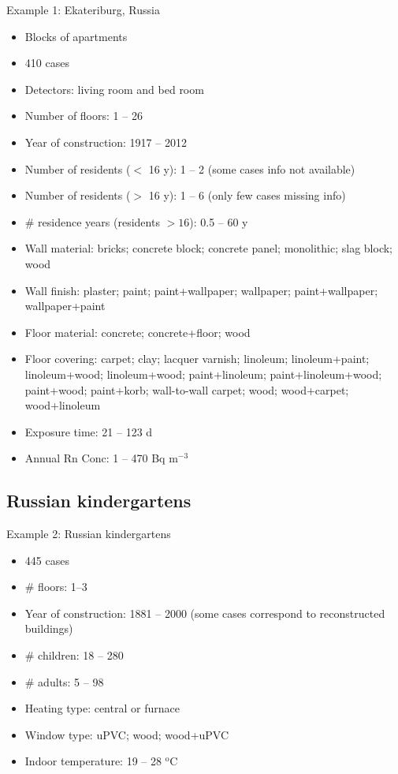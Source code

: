 \documentclass[xcolor=svgnames]{beamer}
\newcommand{\1}{\'{\i}}
\begin{document}
\begin{frame}[allowframebreaks]{Example 1: Ekateriburg, Russia}

\begin{itemize}
\item Blocks of apartments
\item 410 cases
\item Detectors: living room and bed room
\item Number of floors: 1 -- 26
\item Year of construction: 1917 -- 2012
\item Number of residents ($<$ 16 y): 1 -- 2 (some cases info not available)
\item Number of residents ($>$ 16 y): 1 -- 6 (only few cases missing info)
\item \# residence years (residents $>16$): 0.5 -- 60 y
\item Wall material: bricks; concrete block; concrete panel; monolithic; slag block; wood
\item Wall finish: plaster; paint; paint+wallpaper; wallpaper; paint+wallpaper; wallpaper+paint
\item Floor material: concrete; concrete+floor; wood
\item Floor covering: carpet; clay; lacquer varnish; linoleum; linoleum+paint; linoleum+wood; linoleum+wood; paint+linoleum; paint+linoleum+wood; paint+wood; paint+korb; wall-to-wall carpet; wood; wood+carpet; wood+linoleum
\item Exposure time: 21 -- 123 d
\item Annual Rn Conc: 1 -- 470 Bq m$^{-3}$
\end{itemize}

\end{frame}

\subsection{Russian kindergartens}

\begin{frame}[allowframebreaks]{Example 2: Russian kindergartens}

\begin{itemize}
\item 445 cases
\item \# floors: 1--3
\item Year of construction: 1881 -- 2000 (some cases correspond to reconstructed buildings)
\item \# children: 18 -- 280
\item \# adults: 5 -- 98
\item Heating type: central or furnace
\item Window type: uPVC; wood; wood+uPVC
\item Indoor temperature: 19 -- 28 $^{\mathrm{o}}$C
\end{itemize}

\end{frame}
\end{document}
